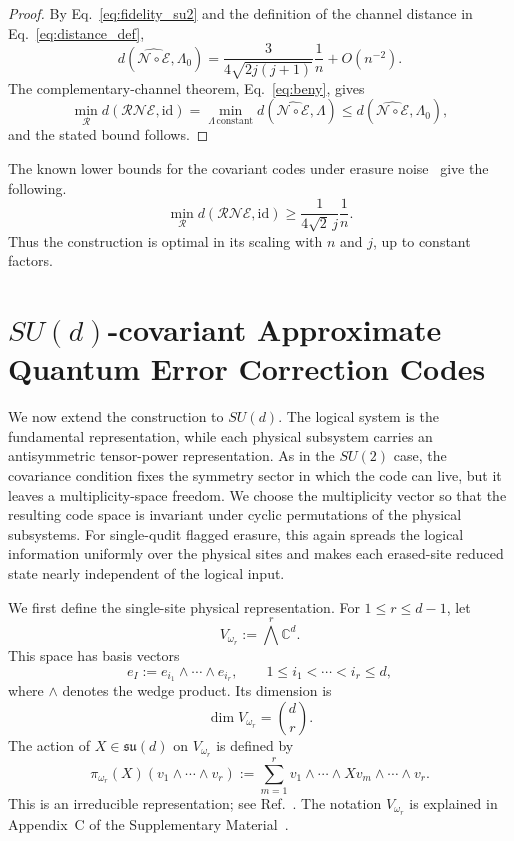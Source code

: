 \documentclass[10pt,twocolumn,superscriptaddress,aps,amsmath,amssymb,citeautoscript,floatfix,prx,longbibliography]{revtex4-2}
\theoremstyle{plain}
\theoremstyle{plain}
\theoremstyle{plain}
\theoremstyle{plain}
\theoremstyle{plain}
\theoremstyle{plain}
\begin{document}
\begin{proof}
By Eq.~\eqref{eq:fidelity_su2} and the definition of the channel distance in Eq.~\eqref{eq:distance_def},
\[
    d\!\left(\widehat{\mathcal N\circ\mathcal E},\Lambda_0\right)
    =
    \frac{3}{4\sqrt{2j(j+1)}}\frac{1}{n}
    +O(n^{-2}) .
\]
The complementary-channel theorem, Eq.~\eqref{eq:beny}, gives
\[
    \min_{\mathcal R}
    d(\mathcal R\mathcal N\mathcal E,\mathrm{id})
    =
    \min_{\Lambda\,\mathrm{constant}}
    d\!\left(\widehat{\mathcal N\circ\mathcal E},\Lambda\right)
    \le
    d\!\left(\widehat{\mathcal N\circ\mathcal E},\Lambda_0\right),
\]
and the stated bound follows.
\end{proof}

The known lower bounds for the covariant codes under erasure noise~\cite{Faist2020} give the following.
\[
    \min_{\mathcal R}
    d(\mathcal R\mathcal N\mathcal E,\mathrm{id})
    \ge
    \frac{1}{4\sqrt{2}\,j}\frac{1}{n} .
\]
Thus the construction is optimal in its scaling with $n$ and $j$, up to constant factors.

\section{\texorpdfstring{$SU(d)$}{SU(d)}-covariant Approximate Quantum Error Correction Codes}\label{sec:main_sud}

We now extend the construction to $SU(d)$. The logical system is the fundamental representation, while each physical subsystem carries an antisymmetric tensor-power representation. As in the $SU(2)$ case, the covariance condition fixes the symmetry sector in which the code can live, but it leaves a multiplicity-space freedom. We choose the multiplicity vector so that the resulting code space is invariant under cyclic permutations of the physical subsystems. For single-qudit flagged erasure, this again spreads the logical information uniformly over the physical sites and makes each erased-site reduced state nearly independent of the logical input.

We first define the single-site physical representation. For $1\le r\le d-1$, let
\begin{equation}\label{eq:vomegar_def}
    V_{\omega_r}:=\bigwedge^r \mathbb C^d .
\end{equation}
This space has basis vectors
$$
    e_I:=e_{i_1}\wedge\cdots\wedge e_{i_r},
    \qquad
    1\le i_1<\cdots<i_r\le d,
$$
where $\wedge$ denotes the wedge product. Its dimension is
$$
    \dim V_{\omega_r}=\binom{d}{r}.
$$
The action of $X\in\mathfrak{su}(d)$ on $V_{\omega_r}$ is defined by
\begin{equation}\label{eq:sud_vomegar_def}
    \pi_{\omega_r}(X)
    \left(v_1\wedge\cdots\wedge v_r\right)
    :=
    \sum_{m=1}^r
    v_1\wedge\cdots\wedge Xv_m\wedge\cdots\wedge v_r .
\end{equation}
This is an irreducible representation; see Ref.~\cite{FultonHarris1991}. The notation $V_{\omega_r}$ is explained in Appendix~C of the Supplementary Material~\cite{SuppMat}.
\end{document}
